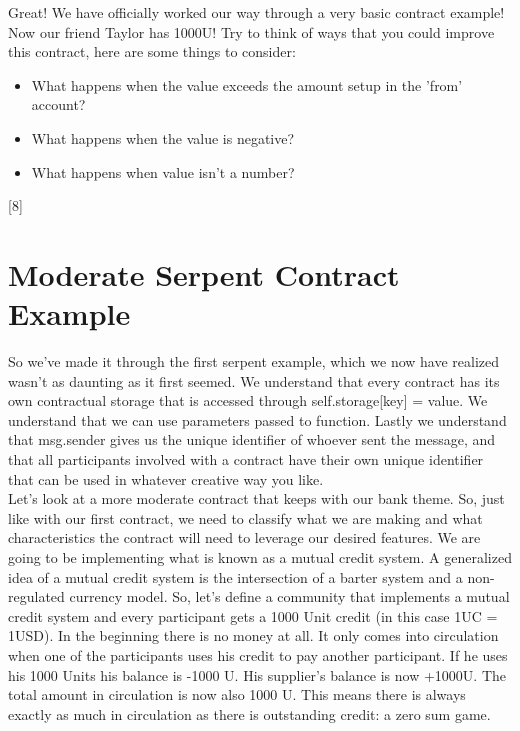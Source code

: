 \documentclass[12pt]{article}
\begin{document}
Great! We have officially worked our way through a very basic contract example! Now our friend Taylor has 1000U! Try to think of ways that you could improve this contract, here are some things to consider:

\begin{itemize}
\item What happens when the value exceeds the amount setup in the 'from' account?
\item What happens when the value is negative?
\item What happens when value isn't a number?
\end{itemize}

[8]

\section{Moderate Serpent Contract Example}

	So we've made it through the first serpent example, which we now have realized wasn't as daunting as it first seemed. We understand that every contract has its own contractual storage that is accessed through self.storage[key] = value. We understand that we can use parameters passed to function. Lastly we understand that msg.sender gives us the unique identifier of whoever sent the message, and that all participants involved with a contract have their own unique identifier that can be used in whatever creative way you like. \\

Let's look at a more moderate contract that keeps with our bank theme. So, just like with our first contract, we need to classify what we are making and what characteristics the contract will need to leverage our desired features. We are going to be implementing what is known as a mutual credit system. A generalized idea of a mutual credit system is the intersection of a barter system and a non-regulated currency model. So, let's define a community that implements a mutual credit system and every participant gets a 1000 Unit credit (in this case 1UC = 1USD). In the beginning there is no money at all. It only comes into circulation when one of the participants uses his credit to pay another participant. If he uses his 1000 Units his balance is -1000 U. His supplier's balance is now +1000U. The total amount in circulation is now also 1000 U. This means there is always exactly as much in circulation as there is outstanding credit: a zero sum game.
\end{document}
